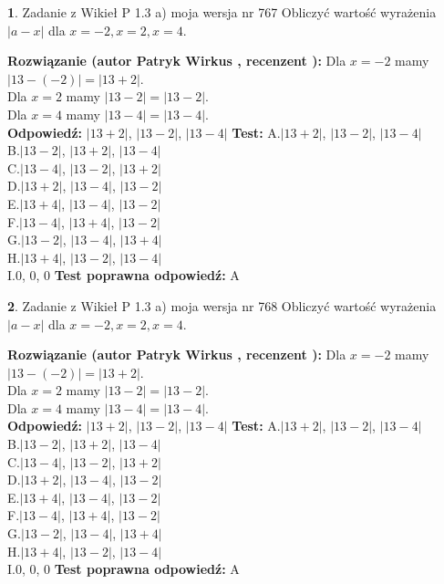 \documentclass[12pt, a4paper]{article}
\theoremstyle{definition} %
\newtheorem{zad}{}
\newcommand{\zadStart}[1]{\begin{zad}#1\newline}
\newcommand{\zadStop}{\end{zad}}
\newcommand{\rozwStart}[2]{\noindent \textbf{Rozwiązanie (autor #1 , recenzent #2): }\newline}
\newcommand{\rozwStop}{\newline}
\newcommand{\odpStart}{\noindent \textbf{Odpowiedź:}\newline}
\newcommand{\odpStop}{\newline}
\newcommand{\testStart}{\noindent \textbf{Test:}\newline}
\newcommand{\testStop}{\newline}
\newcommand{\kluczStart}{\noindent \textbf{Test poprawna odpowiedź:}\newline}
\newcommand{\kluczStop}{\newline}
\begin{document}
\zadStart{Zadanie z Wikieł P 1.3 a) moja wersja nr 767}
Obliczyć wartość wyrażenia $|a - x|$ dla $x=-2,x=2,x=4$.
\zadStop
\rozwStart{Patryk Wirkus}{}
Dla $x = -2$ mamy $|13 - (-2)| = |13 + 2|$.\\
Dla $x = 2$ mamy $|13 - 2| = |13 - 2|$.\\
Dla $x = 4$ mamy $|13 - 4| = |13 - 4|$.\\
\rozwStop
\odpStart
$|13 + 2|$, $|13 - 2|$, $|13 - 4|$
\odpStop
\testStart
A.$|13 + 2|$, $|13 - 2|$, $|13 - 4|$\\
B.$|13 - 2|$, $|13 + 2|$, $|13 - 4|$\\
C.$|13 - 4|$, $|13 - 2|$, $|13 + 2|$\\
D.$|13 + 2|$, $|13 - 4|$, $|13 - 2|$\\
E.$|13 + 4|$, $|13 - 4|$, $|13 - 2|$\\
F.$|13 - 4|$, $|13 + 4|$, $|13 - 2|$\\
G.$|13 - 2|$, $|13 - 4|$, $|13 + 4|$\\
H.$|13 + 4|$, $|13 - 2|$, $|13 - 4|$\\
I.$0$, $0$, $0$
\testStop
\kluczStart
A
\kluczStop



\zadStart{Zadanie z Wikieł P 1.3 a) moja wersja nr 768}
Obliczyć wartość wyrażenia $|a - x|$ dla $x=-2,x=2,x=4$.
\zadStop
\rozwStart{Patryk Wirkus}{}
Dla $x = -2$ mamy $|13 - (-2)| = |13 + 2|$.\\
Dla $x = 2$ mamy $|13 - 2| = |13 - 2|$.\\
Dla $x = 4$ mamy $|13 - 4| = |13 - 4|$.\\
\rozwStop
\odpStart
$|13 + 2|$, $|13 - 2|$, $|13 - 4|$
\odpStop
\testStart
A.$|13 + 2|$, $|13 - 2|$, $|13 - 4|$\\
B.$|13 - 2|$, $|13 + 2|$, $|13 - 4|$\\
C.$|13 - 4|$, $|13 - 2|$, $|13 + 2|$\\
D.$|13 + 2|$, $|13 - 4|$, $|13 - 2|$\\
E.$|13 + 4|$, $|13 - 4|$, $|13 - 2|$\\
F.$|13 - 4|$, $|13 + 4|$, $|13 - 2|$\\
G.$|13 - 2|$, $|13 - 4|$, $|13 + 4|$\\
H.$|13 + 4|$, $|13 - 2|$, $|13 - 4|$\\
I.$0$, $0$, $0$
\testStop
\kluczStart
A
\kluczStop
\end{document}
